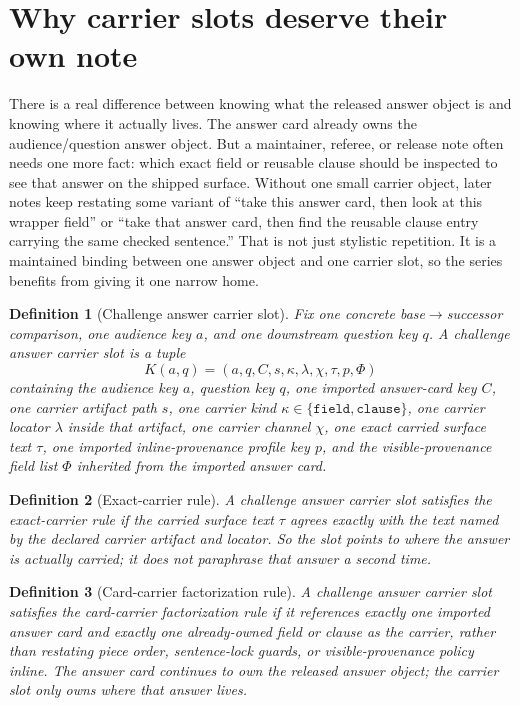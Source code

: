 \documentclass[11pt]{article}
\newtheorem{definition}{Definition}
\begin{document}
\section{Why carrier slots deserve their own note}
There is a real difference between knowing what the released answer object is and knowing where it actually lives.
The answer card already owns the audience/question answer object.
But a maintainer, referee, or release note often needs one more fact: which exact field or reusable clause should be inspected to see that answer on the shipped surface.
Without one small carrier object, later notes keep restating some variant of ``take this answer card, then look at this wrapper field'' or ``take that answer card, then find the reusable clause entry carrying the same checked sentence.''
That is not just stylistic repetition.
It is a maintained binding between one answer object and one carrier slot, so the series benefits from giving it one narrow home.

\begin{definition}[Challenge answer carrier slot]
Fix one concrete base$\to$successor comparison, one audience key $a$, and one downstream question key $q$.
A \emph{challenge answer carrier slot} is a tuple
\[
K(a,q)=(a,q,C,s,\kappa,\lambda,\chi,\tau,p,\Phi)
\]
containing the audience key $a$, question key $q$, one imported answer-card key $C$, one carrier artifact path $s$, one carrier kind $\kappa\in\{\texttt{field},\texttt{clause}\}$, one carrier locator $\lambda$ inside that artifact, one carrier channel $\chi$, one exact carried surface text $\tau$, one imported inline-provenance profile key $p$, and the visible-provenance field list $\Phi$ inherited from the imported answer card.
\end{definition}

\begin{definition}[Exact-carrier rule]
A challenge answer carrier slot satisfies the \emph{exact-carrier rule} if the carried surface text $\tau$ agrees exactly with the text named by the declared carrier artifact and locator.
So the slot points to where the answer is actually carried; it does not paraphrase that answer a second time.
\end{definition}

\begin{definition}[Card-carrier factorization rule]
A challenge answer carrier slot satisfies the \emph{card-carrier factorization rule} if it references exactly one imported answer card and exactly one already-owned field or clause as the carrier, rather than restating piece order, sentence-lock guards, or visible-provenance policy inline.
The answer card continues to own the released answer object; the carrier slot only owns where that answer lives.
\end{definition}
\end{document}
